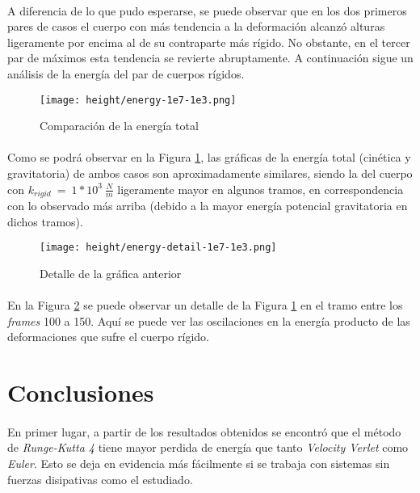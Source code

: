 \documentclass[12pt, twocolumn]{article}
\begin{document}
	\paragraph{} A diferencia de lo que pudo esperarse, se puede observar que en los dos primeros pares de casos el cuerpo con más tendencia a la deformación alcanzó alturas ligeramente por encima al de su contraparte más rígido. No obstante, en el tercer par de máximos esta tendencia se revierte abruptamente. A continuación sigue un análisis de la energía del par de cuerpos rígidos.
	
    \begin{figure}[H]
		\centering
		\texttt{[image: height/energy-1e7-1e3.png]}
		\caption{Comparación de la energía total}
		\label{e7ve3en}
	\end{figure}
	
	\paragraph{} Como se podrá observar en la Figura \ref{e7ve3en}, las gráficas de la energía total (cinética y gravitatoria) de ambos casos son aproximadamente similares, siendo la del cuerpo con $k_{rigid}\:=\:1*10^3\:\frac{N}{m}$ ligeramente mayor en algunos tramos, en correspondencia con lo observado más arriba (debido a la mayor energía potencial gravitatoria en dichos tramos).
	
    \begin{figure}[H]
		\centering
		\texttt{[image: height/energy-detail-1e7-1e3.png]}
		\caption{Detalle de la gráfica anterior}
		\label{e7ve3detail}
	\end{figure}
	
	\paragraph{} En la Figura \ref{e7ve3detail} se puede observar un detalle de la Figura \ref{e7ve3en} en el tramo entre los \textit{frames} 100 a 150. Aquí se puede ver las oscilaciones en la energía producto de las deformaciones que sufre el cuerpo rígido. 
	
	\section{Conclusiones}
	
	\paragraph{} En primer lugar, a partir de los resultados obtenidos se encontró que el método de \textit{Runge-Kutta 4} tiene mayor perdida de energía que tanto \textit{Velocity Verlet} como \textit{Euler}. Esto se deja en evidencia más fácilmente si se trabaja con sistemas sin fuerzas disipativas como el estudiado.
	
\end{document}
